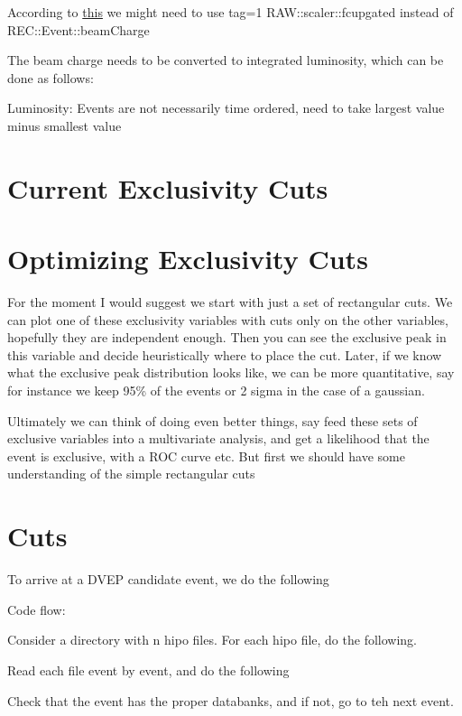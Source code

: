     According to \href{https://clas12.discourse.group/t/accessing-beam-charge-information/239}{this} we might need to use tag=1 RAW::scaler::fcupgated instead of REC::Event::beamCharge
    

The beam charge needs to be converted to integrated luminosity, which can be done as follows:

Luminosity: Events are not necessarily time ordered, need to take largest value minus smallest value  



\section{Current Exclusivity Cuts}

\section{Optimizing Exclusivity Cuts}
    For the moment I would suggest we start with just a set of rectangular cuts. We can plot one of these exclusivity variables with cuts only on the other variables, hopefully they are independent enough. Then you can see the exclusive peak in this variable and decide heuristically where to place the cut. Later, if we know what the exclusive peak distribution looks like, we can be more quantitative, say for instance we keep 95\% of the events or 2 sigma in the case of a gaussian.
    
    Ultimately we can think of doing even better things, say feed these sets of exclusive variables into a multivariate analysis, and get a likelihood that the event is exclusive, with a ROC curve etc. But first we should have some understanding of the simple rectangular cuts
    




\section{Cuts}

To arrive at a DVEP candidate event, we do the following


Code flow:

Consider a directory with n hipo files. For each hipo file, do the following.

Read each file event by event, and do the following

Check that the event has the proper databanks, and if not, go to teh next event.

